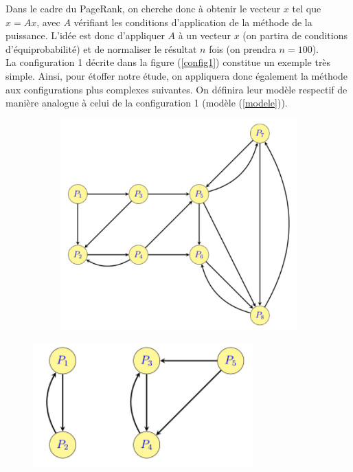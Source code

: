 \documentclass[a4paper,10pt]{report}
\begin{document}
\newpage
\indent Dans le cadre du PageRank, on cherche donc à obtenir le vecteur $x$ tel que $x=Ax$, avec $A$ vérifiant les conditions d'application de la méthode de la puissance. L'idée est donc d'appliquer $A$ à un vecteur $x$ (on partira de conditions d'équiprobabilité) et de normaliser le résultat $n$ fois (on prendra $n=100$). \\

\indent La configuration 1 décrite dans la figure (\ref{config1}) constitue un exemple très simple. Ainsi, pour étoffer notre étude, on appliquera donc également la méthode aux configurations plus complexes suivantes. On définira leur modèle respectif de manière analogue à celui de la configuration 1 (modèle (\ref{modele})).
\begin{figure}[H]
\caption{PageRank : configurations 2 à 5}
   \begin{minipage}[c]{.48\linewidth}
   \begin{figure}[H]
   \includegraphics[width=\textwidth]{config2.png}
   \end{figure}
   \end{minipage} \hfill
   \begin{minipage}[c]{.48\linewidth}
   \includegraphics[width=\textwidth]{config3.png}
   \end{minipage}
\end{figure}
\end{document}
